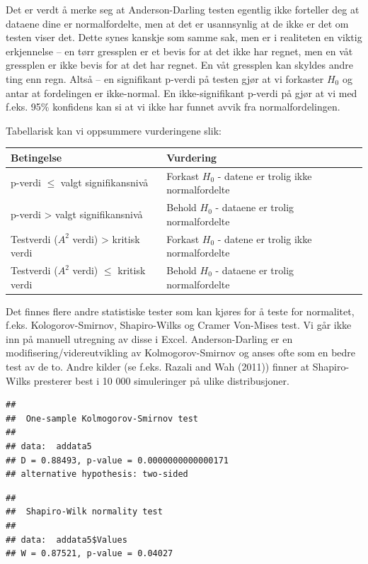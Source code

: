 \documentclass[
]{article}
\begin{document}
Det er verdt å merke seg at Anderson-Darling testen egentlig ikke
forteller deg at dataene dine er normalfordelte, men at det er
usannsynlig at de ikke er det om testen viser det. Dette synes kanskje
som samme sak, men er i realiteten en viktig erkjennelse -- en tørr
gressplen er et bevis for at det ikke har regnet, men en våt gressplen
er ikke bevis for at det har regnet. En våt gressplen kan skyldes andre
ting enn regn. Altså -- en signifikant p-verdi på testen gjør at vi
forkaster \(H_0\) og antar at fordelingen er ikke-normal. En
ikke-signifikant p-verdi på gjør at vi med f.eks. 95\% konfidens kan si
at vi ikke har funnet avvik fra normalfordelingen.

Tabellarisk kan vi oppsummere vurderingene slik:

\begin{table}[!h]
\centering
\begin{tabular}{l|l}
\hline
Betingelse & Vurdering\\
\hline
p-verdi $\le$ valgt signifikansnivå & Forkast $H_0$ - datene er trolig ikke normalfordelte\\
\hline
p-verdi > valgt signifikansnivå & Behold $H_0$ - dataene er trolig normalfordelte\\
\hline
Testverdi ($A^2$ verdi) > kritisk verdi & Forkast $H_0$ - datene er trolig ikke normalfordelte\\
\hline
Testverdi ($A^2$ verdi) $\le$ kritisk verdi & Behold $H_0$ - dataene er trolig normalfordelte\\
\hline
\end{tabular}
\end{table}

Det finnes flere andre statistiske tester som kan kjøres for å teste for
normalitet, f.eks. Kologorov-Smirnov, Shapiro-Wilks og Cramer Von-Mises
test. Vi går ikke inn på manuell utregning av disse i Excel.
Anderson-Darling er en modifisering/videreutvikling av
Kolmogorov-Smirnov og anses ofte som en bedre test av de to. Andre
kilder (se f.eks. Razali and Wah (2011)) finner at Shapiro-Wilks
presterer best i 10 000 simuleringer på ulike distribusjoner.

\begin{verbatim}
## 
##  One-sample Kolmogorov-Smirnov test
## 
## data:  addata5
## D = 0.88493, p-value = 0.0000000000000171
## alternative hypothesis: two-sided
\end{verbatim}

\begin{verbatim}
## 
##  Shapiro-Wilk normality test
## 
## data:  addata5$Values
## W = 0.87521, p-value = 0.04027
\end{verbatim}
\end{document}
